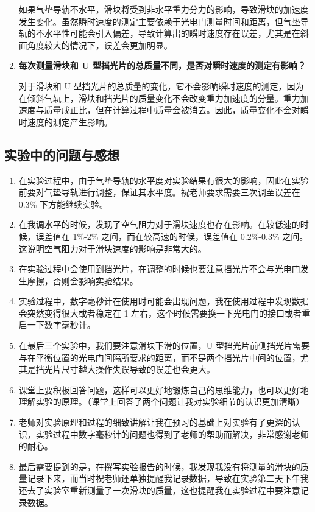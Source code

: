 \documentclass[UTF8]{article}
\theoremstyle{MyLineTheoremStyle} %
\theoremstyle{MyBlockTheoremStyle} %
\theoremstyle{MySubsubsectionStyle} %
\begin{document}
\begin{enumerate}
    如果气垫导轨不水平，滑块将受到非水平重力分力的影响，导致滑块的加速度发生变化。虽然瞬时速度的测定主要依赖于光电门测量时间和距离，但气垫导轨的不水平性可能会引入偏差，导致计算出的瞬时速度存在误差，尤其是在斜面角度较大的情况下，误差会更加明显。

    \item \textbf{每次测量滑块和 U 型挡光片的总质量不同，是否对瞬时速度的测定有影响？}
    
    对于滑块和 U 型挡光片的总质量的变化，它不会影响瞬时速度的测定，因为在倾斜气轨上，滑块和挡光片的质量变化不会改变重力加速度的分量。重力加速度与质量成正比，但在计算过程中质量会被消去。因此，质量变化不会对瞬时速度的测定产生影响。
\end{enumerate}

\subsection{实验中的问题与感想}

\begin{enumerate}
    \item 在实验过程中，由于气垫导轨的水平度对实验结果有很大的影响，因此在实验前要对气垫导轨进行调整，保证其水平度。祝老师要求需要三次调至误差在 0.3\% 下方能继续实验。

    \item 在我调水平的时候，发现了空气阻力对于滑块速度也存在影响。在较低速的时候，误差值在 1\%-2\% 之间，而在较高速的时候，误差值在 0.2\%-0.3\% 之间。这说明空气阻力对于滑块速度的影响是非常大的。
    
    \item 在实验过程中会使用到挡光片，在调整的时候也要注意挡光片不会与光电门发生摩擦，否则会影响实验结果。
    
    \item 实验过程中，数字毫秒计在使用时可能会出现问题，我在使用过程中发现数据会突然变得很大或者稳定在 1 左右，这个时候需要换一下光电门的接口或者重启一下数字毫秒计。
    
    \item 在最后三个实验中，我们要注意滑块下滑的位置，U 型挡光片前侧挡光片需要与在平衡位置的光电门间隔所要求的距离，而不是两个挡光片中间的位置，尤其是挡光片尺寸越大操作失误导致的误差也会更大。
    
    \item 课堂上要积极回答问题，这样可以更好地锻炼自己的思维能力，也可以更好地理解实验的原理。（课堂上回答了两个问题让我对实验细节的认识更加清晰）
    
    \item 老师对实验原理和过程的细致讲解让我在预习的基础上对实验有了更深的认识，实验过程中数字毫秒计的问题也得到了老师的帮助而解决，非常感谢老师的耐心。
    
    \item 最后需要提到的是，在撰写实验报告的时候，我发现我没有将测量的滑块的质量记录下来，而当时祝老师还单独提醒我记录数据，导致在实验第二天下午我还去了实验室重新测量了一次滑块的质量，这也提醒我在实验过程中要注意记录数据。
\end{enumerate}
\end{document}
